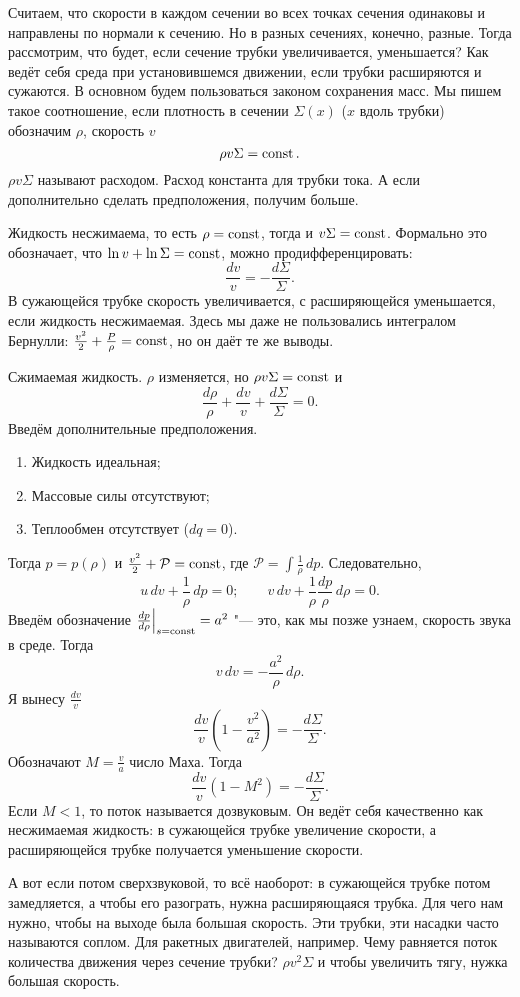 Считаем, что скорости в каждом сечении во всех точках сечения одинаковы и направлены по нормали к сечению. Но в разных сечениях, конечно, разные. Тогда рассмотрим, что будет, если сечение трубки увеличивается, уменьшается? Как ведёт себя среда при установившемся движении, если трубки расширяются и сужаются. В основном будем пользоваться законом сохранения масс. Мы пишем такое соотношение, если плотность в сечении $\Sigma(x)$ ($x$ вдоль трубки) обозначим $\rho$, скорость $v$
 \[
   \rho v\Sigma = \operatorname{const}.
 \]
$\rho v\Sigma$ называют расходом. Расход константа для трубки тока. А если дополнительно сделать предположения, получим больше.
\begin{roItems}
  \item Жидкость несжимаема, то есть $\rho =\operatorname{const}$, тогда и $v\Sigma = \operatorname{const}$. Формально это обозначает, что $\ln v + \ln\Sigma = \operatorname{const}$, можно продифференцировать:
\[
  \frac{dv}{v} = -\frac{d\Sigma}{\Sigma}.
\]
В сужающейся трубке скорость увеличивается, с расширяющейся уменьшается, если жидкость несжимаемая.
Здесь мы даже не пользовались интегралом Бернулли: $\frac{v^2}2+\frac{P}\rho = \operatorname{const}$, но он даёт те же выводы.

\item Сжимаемая жидкость. $\rho$ изменяется, но $\rho v\Sigma=\operatorname{const}$ и
\[
   \frac{d\rho}{\rho} + \frac{dv}{v}+\frac{d\Sigma}{\Sigma}=0.
\]
Введём дополнительные предположения.
\begin{enumerate}
  \item Жидкость идеальная;
  \item Массовые силы отсутствуют;
  \item Теплообмен отсутствует ($dq=0$).
\end{enumerate}
Тогда $p = p(\rho)$ и $\frac{v^2}2+\mathcal P=\operatorname{const}$, где $\mathcal P = \int\frac1\rho\,dp$. Следовательно,
\[
  u\,dv+\frac1\rho\,dp = 0;\qquad v\,dv+\frac1\rho\frac{dp}{\rho}\,d\rho=0.
\]
Введём обозначение $\frac{dp}{d\rho}\Big|_{s=\operatorname{const}} = a^2$ "--- это, как мы позже узнаем, скорость звука в среде. Тогда
\[
  v\,dv = -\frac{a^2}\rho\,d\rho.
\]
Я вынесу $\frac{dv}{v}$
\[
  \frac{dv}{v}\left(1-\frac{v^2}{a^2}\right) = -\frac{d\Sigma}{\Sigma}.
\]
Обозначают $M=\frac{v}a$ число Маха. Тогда
\[
  \frac{dv}{v}(1-M^2) = -\frac{d\Sigma}{\Sigma}.
\]
Если $M<1$, то поток называется дозвуковым. Он ведёт себя качественно как несжимаемая жидкость: в сужающейся трубке увеличение скорости, а расширяющейся трубке получается уменьшение скорости.

А вот если потом сверхзвуковой, то всё наоборот: в сужающейся трубке потом замедляется, а чтобы его разограть, нужна расширяющаяся трубка. Для чего нам нужно, чтобы на выходе была большая скорость. Эти трубки, эти насадки часто называются соплом. Для ракетных двигателей, например.
Чему равняется поток количества движения через сечение трубки? $\rho v^2 \Sigma$ и чтобы увеличить тягу, нужка большая скорость.


\end{roItems}
